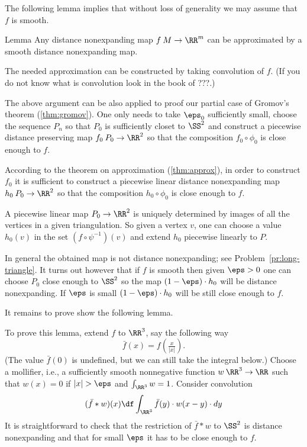 The following lemma implies that without loss of generality we may assume that $f$ is smooth.

\begin{thm}{Lemma}
Any distance nonexpanding map $f\:M\to\RR^m$ can be approximated by a smooth distance nonexpanding map.
\end{thm}

The needed approximation can be constructed by taking convolution of $f$.
(If you do not know what is convolution look in the book of ???.)


The above argument can be also applied to proof our partial case of Gromov's theorem (\ref{thm:gromov}).
One only needs to take $\eps_0$ sufficiently small,
choose the sequence $P_n$ so that $P_0$ is sufficiently closet to $\SS^2$
and construct a piecewise distance preserving map $f_0\:P_0\to \RR^2$ 
so that the composition $f_0\circ \phi_0$ is close enough to $f$.

According to the theorem on approximation (\ref{thm:approx}),
in order to construct $f_0$ it is sufficient to construct a piecewise linear 
distance nonexpanding map $h_0\:P_0\to \RR^2$ so that the composition $h_0\circ \phi_0$ is close enough to $f$.

A piecewise linear map $P_0\to \RR^2$ is uniquely determined by images of all the vertices
in a given triangulation. 
So given a vertex $v$, one can choose a value $h_0(v)$ in the set $(f\circ\psi^{-1})(v)$ and extend $h_0$ piecewise linearly to $P$.

In general the obtained map is not distance nonexpanding; see Problem~\ref{pr:long-triangle}.
It turns out however that if $f$ is smooth then given $\eps>0$ one can choose $P_0$ close enough to $\SS^2$
so the map $(1-\eps)\cdot h_0$ will be distance nonexpanding.
If $\eps$ is small $(1-\eps)\cdot h_0$ will be still close enough to $f$.

It remains to prove show the following lemma.



To prove this lemma, extend $f$ to $\RR^3$, say the following way 
$$\bar f(x)= f(\tfrac{x}{|x|}).$$
(The value $\bar f(0)$ is undefined, but we can still take the integral below.)
Choose a mollifier, i.e., a sufficiently smooth nonnegative function $w\:\RR^3\to \RR$
such that $w(x)=0$ if $|x|>\eps$ and $\int_{\RR^3}w=1$.
Consider convolution 
$$(\bar f*w)(x)
\df \int_{\RR^3} \bar f(y)\cdot w(x-y)\cdot dy$$
It is straightforward to check that the restriction of $\bar f*w$ to $\SS^2$ is distance nonexpanding 
and that for small $\eps$ it has to be close enough to $f$.










